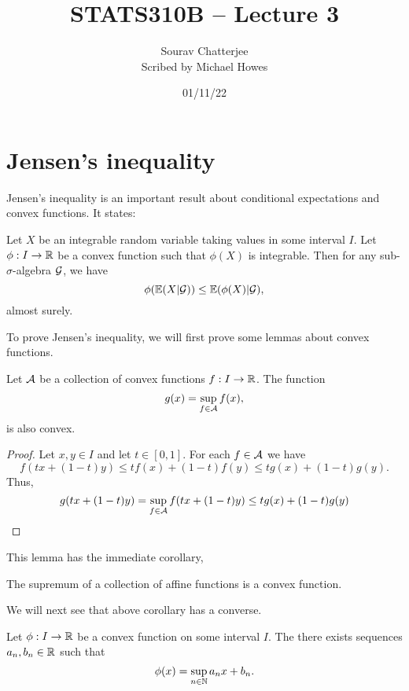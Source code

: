 




\title{STATS310B -- Lecture 3}
\author{Sourav Chatterjee\\ Scribed by Michael Howes}
\date{01/11/22}

\pagestyle{fancy}
\fancyhf{}


\maketitle
\tableofcontents
\section{Jensen's inequality}
Jensen's inequality is an important result about conditional expectations and convex functions. It states:
\begin{theorem}
    Let $X$ be an integrable random variable taking values in some interval $I$. Let $\phi : I \to {\mathbb R}$ be a convex function such that $\phi(X)$ is integrable. Then for any sub-$\sigma$-algebra ${\mathcal{G}}$, we have
    \[\phi({\mathbb{E}}(X|{\mathcal{G}})) \le {\mathbb{E}}(\phi(X)|{\mathcal{G}}), \]
    almost surely.
\end{theorem}
To prove Jensen's inequality, we will first prove some lemmas  about convex functions.
\begin{lemma}
    Let ${\mathcal{A}}$ be a collection of convex functions $f:I\to {\mathbb R}$. The function 
    \[g(x) = \sup_{f \in {\mathcal{A}}} f(x), \]
    is also convex.
\end{lemma}
\begin{proof}
    Let $x,y \in I$ and let $t \in [0,1]$. For each $f \in {\mathcal{A}}$ we have
    \[f(tx+(1-t)y) \le tf(x)+(1-t)f(y) \le tg(x)+(1-t)g(y). \]
    Thus,
    \[g(tx+(1-t)y) = \sup_{f \in {\mathcal{A}}} f(tx+(1-t)y) \le tg(x) + (1-t)g(y) \qedhere \]
\end{proof}
This lemma has the immediate corollary,
\begin{corollary}
    The supremum of a collection of affine functions is a convex function.
\end{corollary}
We will next see that above corollary has a converse.
\begin{lemma}
    Let $\phi :I \to {\mathbb R}$ be a convex function on some interval $I$. The there exists sequences $a_n,b_n \in {\mathbb R}$ such that 
    \[\phi(x) = \sup_{n \in {{\mathbb N}}}a_nx+b_n. \]
\end{lemma}
